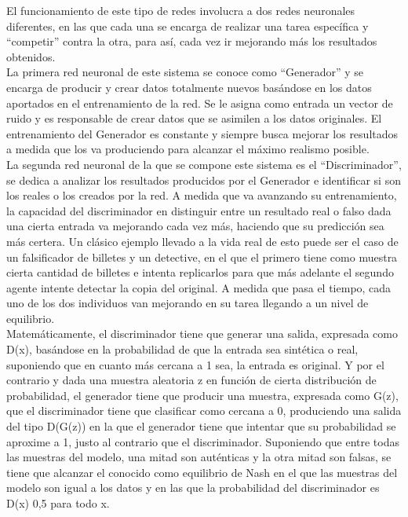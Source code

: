 El funcionamiento de este tipo de redes involucra a dos redes neuronales diferentes, en las que cada una se encarga de realizar una tarea específica y “competir” contra la otra, para así, cada vez ir mejorando más los resultados obtenidos. \\

La primera red neuronal de este sistema se conoce como “Generador” y se encarga de producir y crear datos totalmente nuevos basándose en los datos aportados en el entrenamiento de la red. Se le asigna como entrada un vector de ruido y es responsable de crear datos que se asimilen a los datos originales. El entrenamiento del Generador es constante y siempre busca mejorar los resultados a medida que los va produciendo para alcanzar el máximo realismo posible. \\

La segunda red neuronal de la que se compone este sistema es el “Discriminador”, se dedica a analizar los resultados producidos por el Generador e identificar si son los reales o los creados por la red. A medida que va avanzando su entrenamiento, la capacidad del discriminador en distinguir entre un resultado real o falso dada una cierta entrada va mejorando cada vez más, haciendo que su predicción sea más certera. 
Un clásico ejemplo llevado a la vida real de esto puede ser el caso de un falsificador de billetes y un detective, en el que el primero tiene como muestra cierta cantidad de billetes e intenta replicarlos para que más adelante el segundo agente intente detectar la copia del original. A medida que pasa el tiempo, cada uno de los dos individuos van mejorando en su tarea llegando a un nivel de equilibrio. \\

Matemáticamente, el discriminador tiene que generar una salida, expresada como D(x), basándose en la probabilidad de que la entrada sea sintética o real, suponiendo que en cuanto más cercana a 1 sea, la entrada es original. Y por el contrario y dada una muestra aleatoria z en función de cierta distribución de probabilidad, el generador tiene que producir una muestra, expresada como G(z), que el discriminador tiene que clasificar como cercana a 0, produciendo una salida del tipo D(G(z)) en la que el generador tiene que intentar que su probabilidad se aproxime a 1, justo al contrario que el discriminador. Suponiendo que entre todas las muestras del modelo, una mitad son auténticas y la otra mitad son falsas, se tiene que alcanzar el conocido como equilibrio de Nash en el que las muestras del modelo son igual a los datos y en las que la probabilidad del discriminador es D(x) 0,5 para todo x. \\

